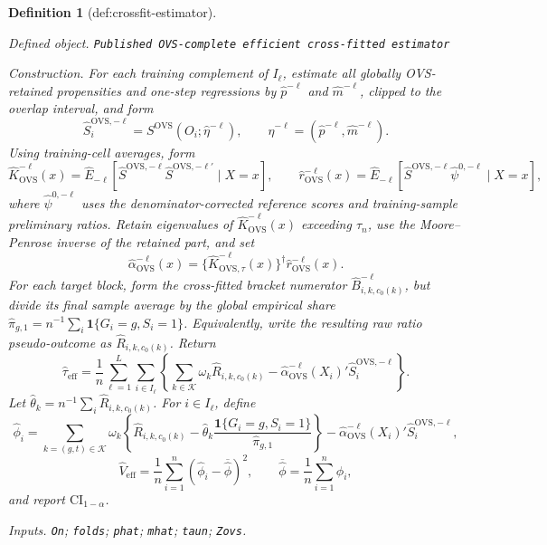 \documentclass{article}
\newtheorem{definition}{Definition}
\begin{document}
\begin{definition}[def:crossfit-estimator]\label{def:crossfit-estimator}
\par\smallskip\noindent\emph{Defined object.} \texttt{Published OVS-\allowbreak{}complete efficient cross-\allowbreak{}fitted estimator}
\par\smallskip\noindent\emph{Construction.} For each training complement of \(I_\ell\), estimate all globally OVS-retained propensities and one-step regressions by \(\widehat p^{-\ell}\) and \(\widehat m^{-\ell}\), clipped to the overlap interval, and form
\[
\widehat S_i^{\mathrm{OVS},-\ell}=S^{\mathrm{OVS}}(O_i;\widehat\eta^{-\ell}),
\qquad \widehat\eta^{-\ell}=(\widehat p^{-\ell},\widehat m^{-\ell}).
\]
Using training-cell averages, form
\[
\widehat K_{\mathrm{OVS}}^{-\ell}(x)
=\widehat E_{-\ell}[\widehat S^{\mathrm{OVS},-\ell}
\widehat S^{\mathrm{OVS},-\ell\prime}\mid X=x],
\qquad
\widehat r_{\mathrm{OVS}}^{-\ell}(x)
=\widehat E_{-\ell}[\widehat S^{\mathrm{OVS},-\ell}\widehat\psi^{0,-\ell}\mid X=x],
\]
where \(\widehat\psi^{0,-\ell}\) uses the denominator-corrected reference scores and training-sample preliminary ratios.  Retain eigenvalues of \(\widehat K_{\mathrm{OVS}}^{-\ell}(x)\) exceeding \(\tau_n\), use the Moore--Penrose inverse of the retained part, and set
\[
\widehat\alpha_{\mathrm{OVS}}^{-\ell}(x)
=\{\widehat K_{\mathrm{OVS},\tau}^{-\ell}(x)\}^{\dagger}
\widehat r_{\mathrm{OVS}}^{-\ell}(x).
\]
For each target block, form the cross-fitted bracket numerator \(\widehat B_{i,k,c_0(k)}^{-\ell}\), but divide its final sample average by the global empirical share
\(\widehat\pi_{g,1}=n^{-1}\sum_i\mathbf 1\{G_i=g,S_i=1\}\).  Equivalently, write the resulting raw ratio pseudo-outcome as \(\widehat R_{i,k,c_0(k)}\).  Return
\[
\widehat\tau_{\mathrm{eff}}
=\frac1n\sum_{\ell=1}^L\sum_{i\in I_\ell}
\left\{\sum_{k\in\mathcal K}\omega_k\widehat R_{i,k,c_0(k)}
-\widehat\alpha_{\mathrm{OVS}}^{-\ell}(X_i)'
\widehat S_i^{\mathrm{OVS},-\ell}\right\}.
\]
Let \(\widehat\theta_k=n^{-1}\sum_i\widehat R_{i,k,c_0(k)}\).  For \(i\in I_\ell\), define
\[
\widehat\phi_i=
\sum_{k=(g,t)\in\mathcal K}\omega_k
\left\{\widehat R_{i,k,c_0(k)}
-\widehat\theta_k\frac{\mathbf 1\{G_i=g,S_i=1\}}{\widehat\pi_{g,1}}\right\}
-\widehat\alpha_{\mathrm{OVS}}^{-\ell}(X_i)'
\widehat S_i^{\mathrm{OVS},-\ell},
\]
\[
\widehat V_{\mathrm{eff}}=\frac1n\sum_{i=1}^n
(\widehat\phi_i-\overline{\widehat\phi})^2,
\qquad
\overline{\widehat\phi}=\frac1n\sum_{i=1}^n\widehat\phi_i,
\]
and report \(\mathrm{CI}_{1-\alpha}\).
\par\smallskip\noindent\emph{Inputs.} \texttt{On}; \texttt{folds}; \texttt{phat}; \texttt{mhat}; \texttt{taun}; \texttt{Zovs}.
\end{definition}
\end{document}
